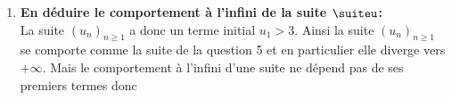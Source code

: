 \begin{correction}
\begin{enumerate}
\begin{enumerate}
\item \textbf{En d\'eduire le comportement \`{a} l'infini de la suite $\suiteu$:}\\
\noindent La suite $(u_n)_{n\geq 1}$ a donc un terme initial $u_1>3$. Ainsi la suite $(u_n)_{n\geq 1}$ se comporte comme la suite de la question 5 et en particulier elle diverge vers $+\infty$. Mais le comportement \`{a} l'infini d'une suite ne d\'epend pas de ses premiers termes donc 
\end{enumerate} 
\end{enumerate}
\end{correction}